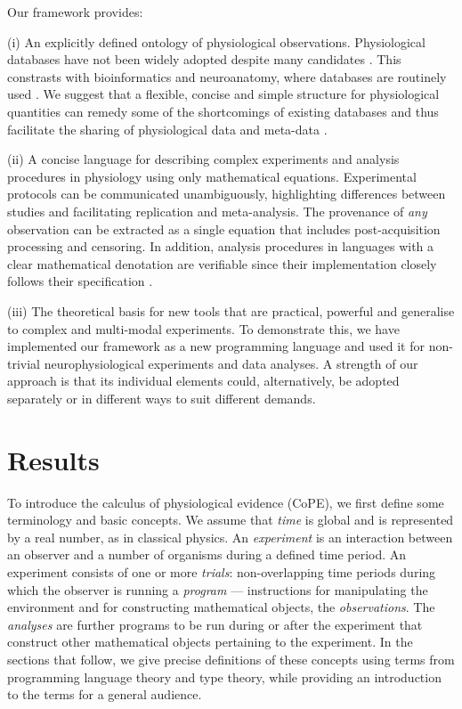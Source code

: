 \documentclass[11pt]{article}
\begin{document}
Our framework provides:

(i) An explicitly defined ontology of physiological
observations. Physiological databases have not been widely adopted
\citep{Herz2008, Amari2002} despite many candidates \citep{Jessop2010,
  Teeters2008, Frishkoff2009, Katz2010}.  This constrasts with
bioinformatics and neuroanatomy, where databases are routinely used
\citep{Rodriguez-Tome1996, Ascoli2007}. We suggest that a flexible,
concise and simple structure for physiological quantities can remedy
some of the shortcomings \citep{Gardner2005, Amari2002} of existing
databases and thus facilitate the sharing of physiological data and
meta-data \citep{Insel2003}.

(ii) A concise language for describing complex experiments and
analysis procedures in physiology using only mathematical
equations. Experimental protocols can be communicated unambiguously,
highlighting differences between studies and facilitating replication
and meta-analysis. The provenance \citep{Pool2002,MacKenzie-Graham2008,
  VanHorn2009} of \emph{any} observation can be extracted as a single
equation that includes post-acquisition processing and censoring. In
addition, analysis procedures in languages with a clear mathematical
denotation are verifiable since their implementation closely
follows their specification \citep{Bird1996}.

(iii) The theoretical basis for new tools that are practical, powerful
and generalise to complex and multi-modal experiments. To demonstrate
this, we have implemented our framework as a new programming language
and used it for non-trivial neurophysiological experiments and data
analyses. A strength of our approach is that its individual elements
could, alternatively, be adopted separately or in different ways to
suit different demands.

\section*{Results}

To introduce the calculus of physiological evidence (CoPE), we first
define some terminology and basic concepts. We assume that \emph{time}
is global and is represented by a real number, as in classical
physics. An \emph{experiment} is an interaction between an observer
and a number of organisms during a defined time period. An experiment
consists of one or more \emph{trials}: non-overlapping time periods
during which the observer is running a \emph{program} --- instructions
for manipulating the environment and for constructing mathematical
objects, the \emph{observations}. The \emph{analyses} are further
programs to be run during or after the experiment that construct other
mathematical objects pertaining to the experiment. In the sections
that follow, we give precise definitions of these concepts using terms
from programming language theory and type theory, while providing
an introduction to the terms for a general audience.
\end{document}
